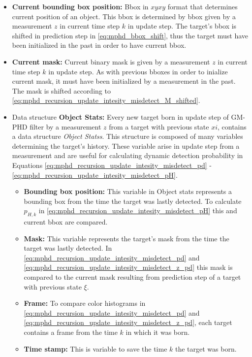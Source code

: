 \begin{itemize}
  \item \textbf{Current bounding box position:} Bbox in $xyxy$ format that determines current position of an object.
  This bbox is determined by bbox given by a measurement $z$ in current time step $k$ in update step. The target's
  bbox is shifted in prediction step in \eqref{eq:mphd_bbox_shift}, thus the target must have been initialized in the
  past in order to have current bbox.
  \item \textbf{Current mask:} Current binary mask is given by a measurement $z$ in current time step $k$ in update
  step. As with previous bboxes in order to inialize current mask, it must have been initialized by a measurement in
  the past. The mask is shifted according to \eqref{eq:mphd_recursion_update_intesity_misdetect_M_shifted}.
  \item Data structure \textbf{Object Stats:} Every new target born in update step of GM-PHD filter by a measurement $z$ from a target with previous state $xi$, contains a data structure \textit{Object Statss}. This structure is composed of many variables determining the target's history. These variable arise in update step from a measurement and are useful for calculating dynamic detection probability in Equations \eqref{eq:mphd_recursion_update_intesity_misdetect_pd} - \eqref{eq:mphd_recursion_update_intesity_misdetect_pH}.
      \begin{itemize}
        \item \textbf{Bounding box position:} This variable in Object stats represents a bounding box from the time
        the target was lastly detected. To calculate $p_{H,k}$ in \eqref{eq:mphd_recursion_update_intesity_misdetect_pH} this and current bbox are compared.
        \item \textbf{Mask:} This variable represents the target's mask from the time the target was lastly detected. In \eqref{eq:mphd_recursion_update_intesity_misdetect_pd} and \eqref{eq:mphd_recursion_update_intesity_misdetect_z_pd} this mask is compared to the current mask
        resulting from prediction step of a target with previous state $\xi$.
        \item \textbf{Frame:} To compare color histograms in \eqref{eq:mphd_recursion_update_intesity_misdetect_pd}
        and \eqref{eq:mphd_recursion_update_intesity_misdetect_z_pd}, each target contains a frame from the time $k$
        in which
        it was born.
        \item \textbf{Time stamp:} This is variable to save the time $k$ the target was born.

\end{itemize}
\end{itemize}
